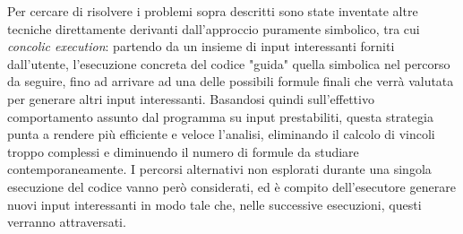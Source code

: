 \documentclass[Lau, oneside]{sapthesis}%
\begin{document}
\newline \newline
Per cercare di risolvere i problemi sopra descritti sono state inventate altre tecniche direttamente derivanti dall'approccio puramente simbolico, tra cui \textit{concolic execution}: partendo da un insieme di input interessanti forniti dall'utente, l'esecuzione concreta del codice "guida" quella simbolica nel percorso da seguire, fino ad arrivare ad una delle possibili formule finali che verrà valutata per generare altri input interessanti.
\newline
Basandosi quindi sull'effettivo comportamento assunto dal programma su input prestabiliti, questa strategia punta a rendere più efficiente e veloce l'analisi, eliminando il calcolo di vincoli troppo complessi e diminuendo il numero di formule da studiare contemporaneamente.
\newline
I percorsi alternativi non esplorati durante una singola esecuzione del codice vanno però considerati, 
ed è compito dell'esecutore generare nuovi input interessanti in modo tale che, nelle successive esecuzioni, questi verranno attraversati.
\end{document}
